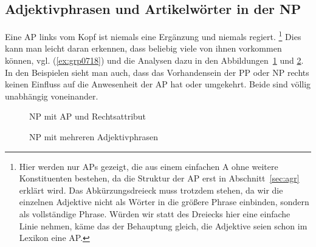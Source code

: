 \subsection{Adjektivphrasen und Artikelwörter in der NP}

\label{sec:adjektiveundartikelwoerter}

Eine AP links vom Kopf ist niemals eine Ergänzung und niemals regiert.%
\footnote{Hier werden nur APs gezeigt, die aus einem einfachen A ohne weitere Konstituenten bestehen, da die Struktur der AP erst in Abschnitt~\ref{sec:agr} erklärt wird.
Das Abkürzungsdreieck muss trotzdem stehen, da wir die einzelnen Adjektive nicht als Wörter in die größere Phrase einbinden, sondern als vollständige Phrase.
Würden wir statt des Dreiecks hier eine einfache Linie nehmen, käme das der Behauptung gleich, die Adjektive seien schon im Lexikon eine AP.
}
Dies kann man leicht daran erkennen, dass beliebig viele von ihnen vorkommen können, vgl. (\ref{ex:grp0718}) und die Analysen dazu in den Abbildungen~\ref{fig:grp0718a} und \ref{fig:grp0718b}.
In den Beispielen sieht man auch, dass das Vorhandensein der PP oder NP rechts keinen Einfluss auf die Anwesenheit der AP hat oder umgekehrt.
Beide sind völlig unabhängig voneinander.

\begin{exe}
  \ex\label{ex:grp0718}
  \begin{xlist}
  \end{xlist}
\end{exe}

\begin{figure}[!htbp]
  \centering
  \caption{NP mit AP und Rechtsattribut}
  \label{fig:grp0718a}
\end{figure}

\begin{figure}[!htbp]
  \centering
  \caption{NP mit mehreren Adjektivphrasen}
  \label{fig:grp0718b}
\end{figure}


